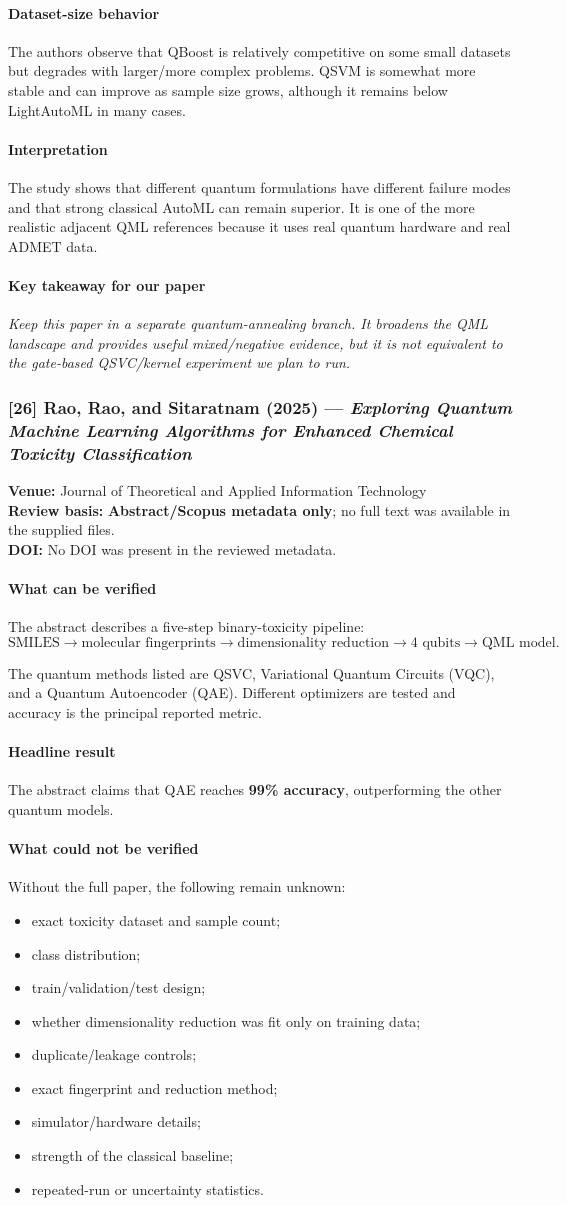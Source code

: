 \documentclass[11pt]{article}
\newcommand{\reviewfield}[2]{\paragraph{#1}#2}
\newcommand{\keytakeaway}[1]{\paragraph{Key takeaway for our paper}\emph{#1}}
\begin{document}
\reviewfield{Dataset-size behavior}{
The authors observe that QBoost is relatively competitive on some small datasets but degrades with larger/more complex problems. QSVM is somewhat more stable and can improve as sample size grows, although it remains below LightAutoML in many cases.
}

\reviewfield{Interpretation}{
The study shows that different quantum formulations have different failure modes and that strong classical AutoML can remain superior. It is one of the more realistic adjacent QML references because it uses real quantum hardware and real ADMET data.
}

\keytakeaway{Keep this paper in a separate quantum-annealing branch. It broadens the QML landscape and provides useful mixed/negative evidence, but it is not equivalent to the gate-based QSVC/kernel experiment we plan to run.}

\subsubsection{[26] Rao, Rao, and Sitaratnam (2025) --- \textit{Exploring Quantum Machine Learning Algorithms for Enhanced Chemical Toxicity Classification}}
\textbf{Venue:} Journal of Theoretical and Applied Information Technology\\
\textbf{Review basis:} \textbf{Abstract/Scopus metadata only}; no full text was available in the supplied files.\\
\textbf{DOI:} No DOI was present in the reviewed metadata.

\reviewfield{What can be verified}{
The abstract describes a five-step binary-toxicity pipeline:
\[
\text{SMILES}\rightarrow\text{molecular fingerprints}\rightarrow
\text{dimensionality reduction}\rightarrow 4\text{ qubits}\rightarrow
\text{QML model}.
\]

The quantum methods listed are QSVC, Variational Quantum Circuits (VQC), and a Quantum Autoencoder (QAE). Different optimizers are tested and accuracy is the principal reported metric.
}

\reviewfield{Headline result}{
The abstract claims that QAE reaches \textbf{99\% accuracy}, outperforming the other quantum models.
}

\reviewfield{What could not be verified}{
Without the full paper, the following remain unknown:
\begin{itemize}
    \item exact toxicity dataset and sample count;
    \item class distribution;
    \item train/validation/test design;
    \item whether dimensionality reduction was fit only on training data;
    \item duplicate/leakage controls;
    \item exact fingerprint and reduction method;
    \item simulator/hardware details;
    \item strength of the classical baseline;
    \item repeated-run or uncertainty statistics.
\end{itemize}
}
\end{document}

